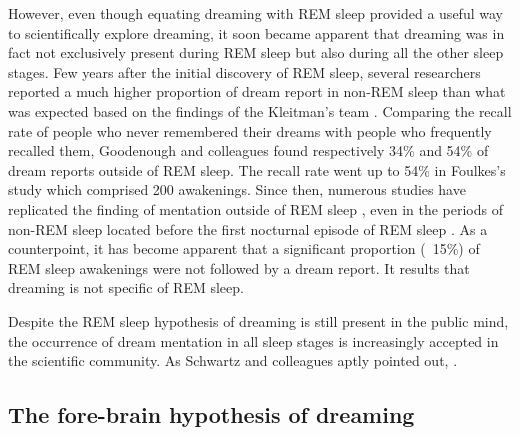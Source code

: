 However, even though equating dreaming with REM sleep provided a useful way to scientifically explore dreaming, it soon became apparent that dreaming was in fact not exclusively present during REM sleep but also during all the other sleep stages. Few years after the initial discovery of REM sleep, several researchers reported a much higher proportion of dream report in non-REM sleep than what was expected based on the findings of the Kleitman’s team \citep{goodenough_comparison_1959, foulkes_dream_1962}. Comparing the recall rate of people who never remembered their dreams with people who frequently recalled them, Goodenough and colleagues found respectively 34\% and 54\% of dream reports outside of REM sleep. The recall rate went up to 54\% in Foulkes’s study which comprised 200 awakenings. Since then, numerous studies have replicated the finding of mentation outside of REM sleep \citep{nielsen_review_2000}, even in the periods of non-REM sleep located before the first nocturnal episode of REM sleep \citep{noreika_early-night_2009}. As a counterpoint, it has become apparent that a significant proportion (~15\%) of REM sleep awakenings were not followed by a dream report. It results that dreaming is not specific of REM sleep.

Despite the REM sleep hypothesis of dreaming is still present in the public mind, the occurrence of dream mentation in all sleep stages is increasingly accepted in the scientific community. As Schwartz and colleagues aptly pointed out,  \citep{schwartz_dreaming:_2005}.

\subsection{The fore-brain hypothesis of dreaming}
\label{sec:dream-research:link:solms}

